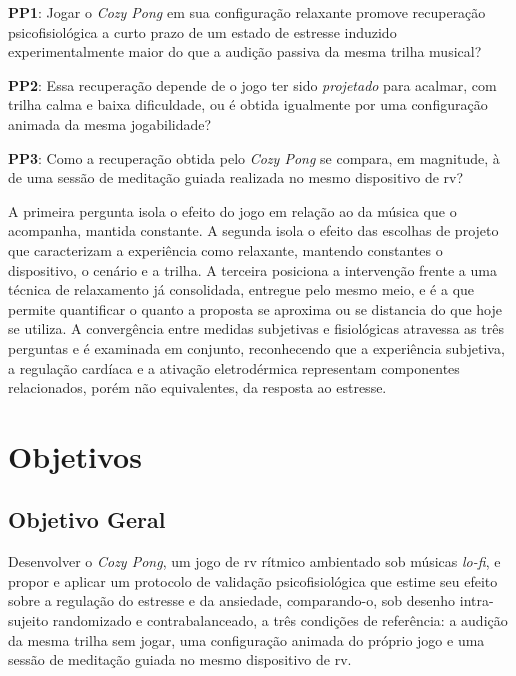\textbf{PP1}: Jogar o \textit{Cozy Pong} em sua configuração relaxante promove recuperação psicofisiológica a curto prazo de um estado de estresse induzido experimentalmente maior do que a audição passiva da mesma trilha musical?

\textbf{PP2}: Essa recuperação depende de o jogo ter sido \emph{projetado} para acalmar, com trilha calma e baixa dificuldade, ou é obtida igualmente por uma configuração animada da mesma jogabilidade?

\textbf{PP3}: Como a recuperação obtida pelo \textit{Cozy Pong} se compara, em magnitude, à de uma sessão de meditação guiada realizada no mesmo dispositivo de \gls{rv}?

A primeira pergunta isola o efeito do jogo em relação ao da música que o acompanha, mantida constante. A segunda isola o efeito das escolhas de projeto que caracterizam a experiência como relaxante, mantendo constantes o dispositivo, o cenário e a trilha. A terceira posiciona a intervenção frente a uma técnica de relaxamento já consolidada, entregue pelo mesmo meio, e é a que permite quantificar o quanto a proposta se aproxima ou se distancia do que hoje se utiliza. A convergência entre medidas subjetivas e fisiológicas atravessa as três perguntas e é examinada em conjunto, reconhecendo que a experiência subjetiva, a regulação cardíaca e a ativação eletrodérmica representam componentes relacionados, porém não equivalentes, da resposta ao estresse.

\section{Objetivos}\label{sec:objetivos}

\subsection{Objetivo Geral}\label{subsec:obj-geral}

Desenvolver o \textit{Cozy Pong}, um jogo de \gls{rv} rítmico ambientado sob músicas \textit{lo-fi}, e propor e aplicar um protocolo de validação psicofisiológica que estime seu efeito sobre a regulação do estresse e da ansiedade, comparando-o, sob desenho intra-sujeito randomizado e contrabalanceado, a três condições de referência: a audição da mesma trilha sem jogar, uma configuração animada do próprio jogo e uma sessão de meditação guiada no mesmo dispositivo de \gls{rv}.

